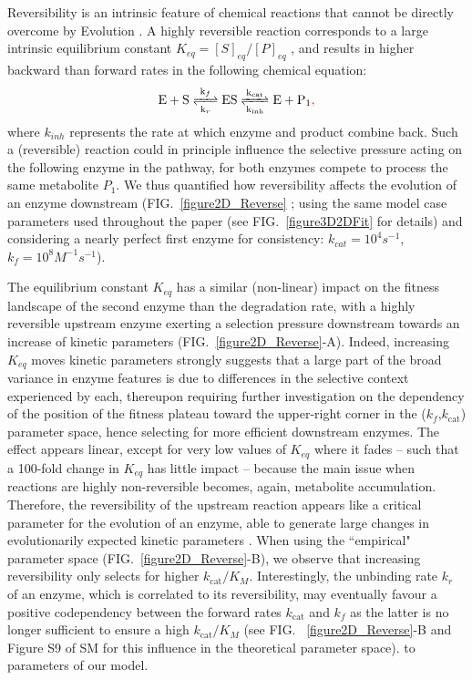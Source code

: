\documentclass[11pt,onecolumn]{article}
\providecommand{\DIFadd}[1]{{\protect\color{blue} \sf #1}} %
\providecommand{\DIFdel}[1]{{\protect\color{red} \scriptsize #1}} %
\providecommand{\DIFaddbegin}{} %
\providecommand{\DIFaddend}{} %
\providecommand{\DIFdelbegin}{} %
\providecommand{\DIFdelend}{} %
\begin{document}
\DIFdel{Reversibility is an intrinsic feature of chemical reactions that cannot be directly overcome by Evolution \citep{Haldane30,Cornish-Bowden79a}. A highly reversible reaction corresponds to a large intrinsic equilibrium constant $K_{eq}=[S]_{eq}/[P]_{eq}$ \citep{Klipp94}, and results in higher backward than forward rates in the following chemical equation: }\begin{displaymath}
\ce{ E + S <=>[k_{f}][k_{r}] ES <=>[k_{cat}][k_{inh}] E + P_1 }\DIFdel{,
\label{chemMM_fullrev}
}\end{displaymath}%
\DIFdel{where $k_{inh}$ represents the rate at which enzyme and product combine back. Such a (reversible) reaction could in principle influence the selective pressure acting on the following enzyme in the pathway, for both enzymes compete to process the same metabolite $P_1$. We thus quantified how reversibility affects the evolution of an enzyme downstream (FIG.~\ref{figure2D_Reverse} ; using the same model case parameters used throughout the paper (see FIG.~\ref{figure3D2DFit}
for details) and considering a nearly perfect first enzyme for consistency: $k_{cat}=10^4s^{-1}$,$k_f=10^8M^{-1}s^{-1}$).
}%

\DIFdel{The equilibrium constant $K_{eq}$ has a similar (non-linear) impact on the fitness landscape of the second enzyme than the degradation rate, with a highly reversible upstream enzyme exerting a selection pressure downstream towards an increase of kinetic parameters (FIG.~\ref{figure2D_Reverse}-A). Indeed, increasing $K_{eq}$ moves }\DIFdelend \DIFaddbegin \DIFadd{kinetic parameters strongly suggests that a large part of }\DIFaddend the \DIFaddbegin \DIFadd{broad variance in enzyme features is due to differences in the selective context experienced by each, thereupon requiring further investigation on the dependency of the position of the }\DIFaddend fitness plateau \DIFdelbegin \DIFdel{toward the upper-right corner in the ($k_f$,$k_\text{cat}$) parameter space, hence selecting for more efficient downstream enzymes. The effect appears linear, except for very low values of $K_{eq}$ where it fades -- such that a 100-fold change in $K_{eq}$ has little impact -- because the main issue when reactions are highly non-reversible becomes, again, metabolite accumulation. Therefore, the reversibility of the upstream reaction appears like a critical parameter for the evolution of an enzyme, able to generate large changes in evolutionarily expected kinetic parameters . When using the ``empirical" parameter space (FIG.~\ref{figure2D_Reverse}-B), we observe that increasing reversibility only selects for higher $k_\text{cat}/K_M$. Interestingly, the unbinding rate $k_r$ of an enzyme, which is correlated to its reversibility, may eventually favour a positive codependency between the forward rates $k_\text{cat}$ and $k_f$ as the latter is no longer sufficient to ensure a high $k_\text{cat}/K_M$ (see FIG.
~\ref{figure2D_Reverse}-B and Figure S9 of SM for this influence in the theoretical parameter space).
}\DIFdelend \DIFaddbegin \DIFadd{to parameters of our model.
}\DIFaddend 
\end{document}
